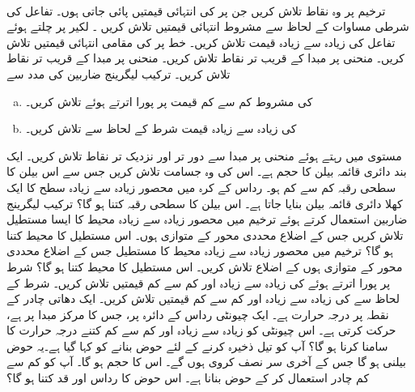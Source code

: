 \\
ترخیم  پر وہ نقاط تلاش  کریں جن پر  کی انتہائی قیمتیں پائی جاتی ہوں۔
تفاعل   کی شرطی مساوات   کے لحاظ سے   مشروط انتہائی  قیمتیں تلاش کریں ۔
 لکیر  پر چلتے ہوئے  تفاعل  کی زیادہ سے زیادہ قیمت تلاش کریں۔
خط  پر   کی مقامی  انتہائی قیمتیں تلاش کریں۔
منحنی  پر مبدا کے  قریب تر نقاط تلاش کریں۔
منحنی  پر مبدا کے قریب تر نقاط تلاش کریں۔
ترکیب لیگرینج ضاربین کی مدد سے 
\begin{enumerate}[a.]
\item
{} کی مشروط کم سے کم  قیمت    پر پورا اترتے ہوئے تلاش کریں۔ 
\item
{} کی زیادہ سے زیادہ قیمت شرط     کے لحاظ سے تلاش کریں۔
\end{enumerate}
مستوی  میں رہتے ہوئے منحنی  پر مبدا  سے دور تر اور نزدیک تر نقاط تلاش کریں۔
ایک بند دائری قائمہ  بیلن کا حجم  ہے۔ اس کی وہ جسامت تلاش کریں جس سے اس بیلن کا سطحی رقبہ کم سے کم ہو۔
رداس  کے کرہ میں محصور   زیادہ سے زیادہ سطح کا ایک کھلا دائری قائمہ بیلن بنایا جاتا ہے۔ اس  بیلن کا سطحی رقبہ کتنا ہو گا؟ 
ترکیب لیگرینج ضاربین استعمال کرتے ہوئے  ترخیم   میں   محصور  زیادہ سے زیادہ محیط کا ایسا    مستطیل  تلاش کریں  جس کے اضلاع محددی محور کے متوازی ہوں۔ اس مستطیل کا محیط کتنا ہو گا؟ 
ترخیم   میں محصور  زیادہ سے زیادہ محیط کا مستطیل جس کے اضلاع محددی  محور کے متوازی ہوں کے اضلاع  تلاش کریں۔ اس مستطیل کا محیط کتنا ہو گا؟
شرط    پر پورا  اترتے ہوئے   کی زیادہ سے زیادہ اور کم سے کم قیمتیں تلاش کریں۔
شرط  کے لحاظ سے  کی زیادہ سے زیادہ اور کم سے کم قیمتیں تلاش کریں۔
ایک دھاتی چادر کے نقطہ  پر درجہ حرارت  ہے۔ ایک چیونٹی  رداس   کے دائرہ پر،   جس کا مرکز مبدا پر ہے،   حرکت کرتی ہے۔ اس چیونٹی کو زیادہ سے زیادہ اور کم سے کم کتنے درجہ حرارت کا سامنا کرنا ہو گا؟ 
آپ کو  تیل ذخیرہ کرنے  کے لئے حوض  بنانے کو کہا گیا ہے۔یہ حوض بیلنی ہو گا جس کے آخری سر نصف کروی ہوں گے۔ اس کا حجم  ہو گا۔ آپ کو کم سے کم چادر استعمال کر کے حوض بنانا ہے۔ اس حوض کا رداس اور قد کتنا ہو گا؟ 

